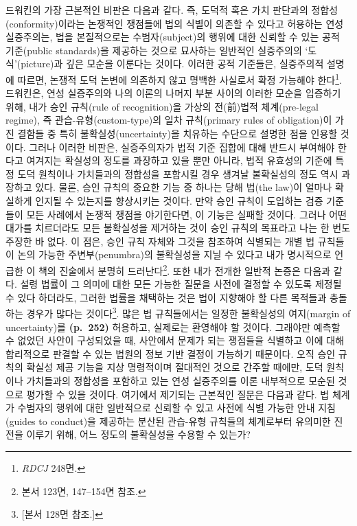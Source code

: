 드워킨의 가장 근본적인 비판은 다음과 같다. 즉, 도덕적 혹은 가치 판단과의
정합성(conformity)이라는 논쟁적인 쟁점들에 법의 식별이 의존할 수 있다고
허용하는 연성 실증주의는, 법을 본질적으로는 수범자(subject)의 행위에
대한 신뢰할 수 있는 공적 기준(public standards)을 제공하는 것으로
묘사하는 일반적인 실증주의의 `도식'(picture)과 깊은 모순을 이룬다는
것이다. 이러한 공적 기준들은, 실증주의적 설명에 따르면, 논쟁적 도덕
논변에 의존하지 않고 명백한 사실로서 확정 가능해야 한다\footnote{\emph{RDCJ}
  248면.}. 드워킨은, 연성 실증주의와 나의 이론의 나머지 부분 사이의
이러한 모순을 입증하기 위해, 내가 승인 규칙(rule of recognition)을
가상의 전(前)법적 체계(pre-legal regime), 즉 관습-유형(custom-type)의
일차 규칙(primary rules of obligation)이 가진 결함들 중 특히
불확실성(uncertainty)을 치유하는 수단으로 설명한 점을 인용할 것이다.
그러나 이러한 비판은, 실증주의자가 법적 기준 집합에 대해 반드시 부여해야
한다고 여겨지는 확실성의 정도를 과장하고 있을 뿐만 아니라, 법적 유효성의
기준에 특정 도덕 원칙이나 가치들과의 정합성을 포함시킬 경우 생겨날
불확실성의 정도 역시 과장하고 있다. 물론, 승인 규칙의 중요한 기능 중
하나는 당해 법(the law)이 얼마나 확실하게 인지될 수 있는지를 향상시키는
것이다. 만약 승인 규칙이 도입하는 검증 기준들이 모든 사례에서 논쟁적
쟁점을 야기한다면, 이 기능은 실패할 것이다. 그러나 어떤 대가를
치르더라도 모든 불확실성을 제거하는 것이 승인 규칙의 목표라고 나는 한
번도 주장한 바 없다. 이 점은, 승인 규칙 자체와 그것을 참조하여 식별되는
개별 법 규칙들이 논의 가능한 주변부(penumbra)의 불확실성을 지닐 수
있다고 내가 명시적으로 언급한 이 책의 진술에서 분명히
드러난다\footnote{본서 123면, 147--154면 참조.}. 또한 내가 전개한 일반적
논증은 다음과 같다. 설령 법률이 그 의미에 대한 모든 가능한 질문을 사전에
결정할 수 있도록 제정될 수 있다 하더라도, 그러한 법률을 채택하는 것은
법이 지향해야 할 다른 목적들과 충돌하는 경우가 많다는 것이다\footnote{{[}본서
  128면 참조.{]}}. 많은 법 규칙들에서는 일정한 불확실성의 여지(margin of
uncertainty)를 \textbf{(p.~252)} 허용하고, 실제로는 환영해야 할 것이다.
그래야만 예측할 수 없었던 사안이 구성되었을 때, 사안에서 문제가 되는
쟁점들을 식별하고 이에 대해 합리적으로 판결할 수 있는 법원의 정보 기반
결정이 가능하기 때문이다. 오직 승인 규칙의 확실성 제공 기능을 지상
명령적이며 절대적인 것으로 간주할 때에만, 도덕 원칙이나 가치들과의
정합성을 포함하고 있는 연성 실증주의를 이론 내부적으로 모순된 것으로
평가할 수 있을 것이다. 여기에서 제기되는 근본적인 질문은 다음과 같다. 법
체계가 수범자의 행위에 대한 일반적으로 신뢰할 수 있고 사전에 식별 가능한
안내 지침(guides to conduct)을 제공하는 분산된 관습-유형 규칙들의
체계로부터 유의미한 진전을 이루기 위해, 어느 정도의 불확실성을 수용할 수
있는가?

